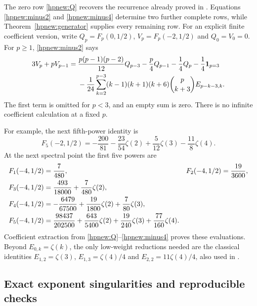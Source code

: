 The zero row \eqref{hpnew:Q} recovers the recurrence already proved
in \cite{RepoExactResonant}. Equations \eqref{hpnew:minus2} and
\eqref{hpnew:minus4} determine two further complete rows, while
Theorem~\ref{hpnew:generator} supplies every remaining row.
For an explicit finite coefficient version, write
$Q_p=F_p(0,1/2)$, $V_p=F_p(-2,1/2)$ and $Q_0=V_0=0$.
For $p\ge1$, \eqref{hpnew:minus2} says
\begin{align}\label{hpnew:finiteV}
 3V_p+pV_{p-1}
 ={}&\frac{p(p-1)(p-2)}{12}Q_{p-3}
       -\frac p4Q_{p-1}-\frac14Q_p-\frac14\mathbf1_{p=3}\notag\\
 &-\frac1{24}\sum_{k=2}^{p-3}(k-1)(k+1)(k+6)
                     \binom p{k+3}E_{p-k-3,k}.
\end{align}
The first term is omitted for $p<3$, and an empty sum is zero.
There is no infinite coefficient calculation at a fixed $p$.

For example, the next fifth-power identity is
\begin{equation}\label{hpnew:fifth}
 \boxed{\displaystyle
 F_5(-2,1/2)=-\frac{200}{81}-\frac{23}{54}\zeta(2)
                  +\frac5{12}\zeta(3)-\frac{11}{8}\zeta(4).}
\end{equation}
At the next spectral point the first five powers are
\begin{align}
 F_1(-4,1/2)&=\frac7{480},&
 F_2(-4,1/2)&=\frac{19}{3600},\notag\\
 F_3(-4,1/2)&=\frac{493}{18000}+\frac7{480}\zeta(2),
                                                      \label{hpnew:table4}\\
 F_4(-4,1/2)&=-\frac{6479}{67500}+\frac{19}{1800}\zeta(2)
                              +\frac7{80}\zeta(3),\notag\\
 F_5(-4,1/2)&=\frac{98437}{202500}+\frac{643}{5400}\zeta(2)
                +\frac{19}{240}\zeta(3)+\frac{77}{160}\zeta(4).
                                                        \notag
\end{align}
Coefficient extraction from \eqref{hpnew:Q}--\eqref{hpnew:minus4}
proves these evaluations. Beyond $E_{0,k}=\zeta(k)$, the only
low-weight reductions needed are the classical identities
$E_{1,2}=\zeta(3)$, $E_{1,3}=\zeta(4)/4$ and
$E_{2,2}=11\zeta(4)/4$, also used in \cite{RepoExactResonant}.

\subsection{Exact exponent singularities and reproducible checks}

